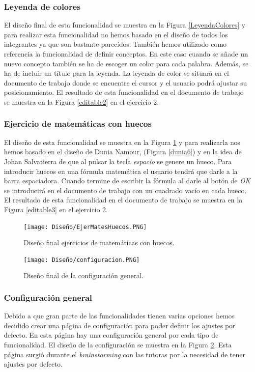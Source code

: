 \subsubsection{Leyenda de colores}
El diseño final de esta funcionalidad se muestra en la Figura \ref{LeyendaColores} y para realizar esta funcionalidad no hemos basado en el diseño de todos los integrantes ya que son bastante parecidos. También hemos utilizado como referencia la funcionalidad de definir conceptos. En este caso cuando se añade un nuevo concepto también se ha de escoger un color para cada palabra. Además, se ha de incluir un título para la leyenda. La leyenda de color se situará en el documento de trabajo donde se encuentre el cursor y el usuario podrá ajustar su posicionamiento. El resultado de esta funcionalidad en el documento de trabajo se muestra en la Figura \ref{editable2} en el ejercicio 2.


\subsubsection{Ejercicio de matemáticas con huecos}
El diseño de esta funcionalidad se muestra en la Figura \ref{matesHueco} y para realizarla nos hemos basado en el diseño de Dunia Namour, (Figura \ref{dunia6}) y en la idea de Johan Salvatierra de que al pulsar la tecla \textit{espacio} se genere un hueco. Para introducir huecos en una fórmula matemática el usuario tendrá que darle a la barra espaciadora. Cuando termine de escribir la fórmula al darle al botón de \textit{OK} se introducirá en el documento de trabajo con un cuadrado vacío en cada hueco. El resultado de esta funcionalidad en el documento de trabajo se muestra en la Figura \ref{editable3} en el ejercicio 2.

\begin{figure}[ht!]
  \centering
  \texttt{[image: Diseño/EjerMatesHuecos.PNG]}
  \caption{Diseño final ejercicios de matemáticas con huecos.}
  \label{matesHueco}
\end{figure}
\begin{figure}[ht!]
  \centering
  \texttt{[image: Diseño/configuracion.PNG]}
  \caption{Diseño final de la configuración general.}
  \label{configu}
\end{figure}
\subsubsection{Configuración general}
Debido a que gran parte de las funcionalidades tienen varias opciones hemos decidido crear una página de configuración para poder definir los ajustes por defecto. En esta página hay una configuración general por cada tipo de funcionalidad. El diseño de la configuración se muestra en la Figura \ref{configu}. Esta página surgió durante el \textit{brainstorming} con las tutoras por la necesidad de tener ajustes por defecto.



